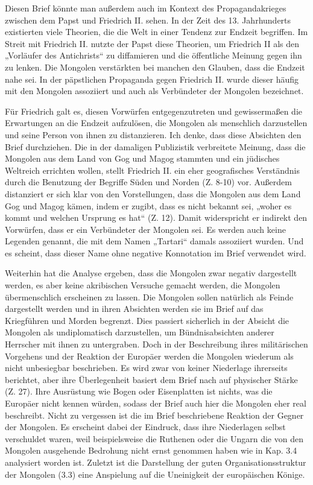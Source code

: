 \documentclass{../../sem_paper}
\begin{document}
Diesen Brief könnte man außerdem auch im Kontext des Propagandakrieges
zwischen dem Papst und Friedrich II. sehen. In der Zeit des 13. Jahrhunderts existierten
viele Theorien, die die Welt in einer Tendenz zur Endzeit begriffen. Im Streit mit
Friedrich II. nutzte der Papst diese Theorien, um Friedrich II als den „Vorläufer des
Antichrists“\autocite[69]{schaller1998} zu diffamieren und die öffentliche Meinung gegen ihn zu lenken. Die
Mongolen verstärkten bei manchen den Glauben, dass die Endzeit nahe sei. In der
päpstlichen Propaganda gegen Friedrich II. wurde dieser häufig mit den Mongolen
assoziiert und auch als Verbündeter der Mongolen bezeichnet.\autocite[469]{rader2010}

Für Friedrich galt es, diesen Vorwürfen entgegenzutreten und gewissermaßen die
Erwartungen an die Endzeit aufzulösen, die Mongolen als menschlich darzustellen und
seine Person von ihnen zu distanzieren. Ich denke, dass diese Absichten den Brief
durchziehen. Die in der damaligen Publizistik verbreitete Meinung, dass die Mongolen
aus dem Land von Gog und Magog stammten und ein jüdisches Weltreich errichten
wollen, stellt Friedrich II. ein eher geografisches Verständnis durch die Benutzung der
Begriffe Süden und Norden (Z. 8-10) vor. Außerdem distanziert er sich klar von den
Vorstellungen, dass die Mongolen aus dem Land Gog und Magog kämen, indem er
zugibt, dass es nicht bekannt sei, „woher es kommt und welchen Ursprung es hat“ (Z.
12). Damit widerspricht er indirekt den Vorwürfen, dass er ein Verbündeter der
Mongolen sei. Es werden auch keine Legenden genannt, die mit dem Namen „Tartari“
damals assoziiert wurden. Und es scheint, dass dieser Name ohne negative Konnotation
im Brief verwendet wird.

Weiterhin hat die Analyse ergeben, dass die Mongolen zwar negativ dargestellt
werden, es aber keine akribischen Versuche gemacht werden, die Mongolen übermenschlich
erscheinen zu lassen. Die Mongolen sollen natürlich als Feinde dargestellt werden und
in ihren Absichten werden sie im Brief auf das Kriegführen und Morden begrenzt. Dies
passiert sicherlich in der Absicht die Mongolen als undiplomatisch darzustellen, um
Bündnisabsichten anderer Herrscher mit ihnen zu untergraben. Doch in der
Beschreibung ihres militärischen Vorgehens und der Reaktion der Europäer werden die
Mongolen wiederum als nicht unbesiegbar beschrieben. Es wird zwar von keiner
Niederlage ihrerseits berichtet, aber ihre Überlegenheit basiert dem Brief nach auf
physischer Stärke (Z. 27). Ihre Ausrüstung wie Bogen oder Eisenplatten ist nichts, was
die Europäer nicht kennen würden, sodass der Brief auch hier die Mongolen eher real
beschreibt. Nicht zu vergessen ist die im Brief beschriebene Reaktion der Gegner der
Mongolen. Es erscheint dabei der Eindruck, dass ihre Niederlagen selbst verschuldet
waren, weil beispielsweise die Ruthenen oder die Ungarn die von den Mongolen
ausgehende Bedrohung nicht ernst genommen haben wie in Kap. 3.4 analysiert worden ist.
Zuletzt ist die Darstellung der guten Organisationsstruktur der Mongolen (3.3) eine
Anspielung auf die Uneinigkeit der europäischen Könige.
\end{document}

